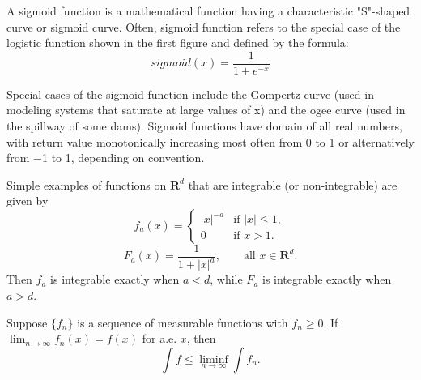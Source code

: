 \begin{definition}
	A sigmoid function is a mathematical function having a characteristic "S"-shaped curve or sigmoid curve. Often, sigmoid function refers to the special case of the logistic function shown in the first figure and defined by the formula:
	\begin{equation}
	sigmoid(x) = \frac{1}{1 + e^{-x}}
	\end{equation}

	\begin{figure}[H]
		\centering
	\end{figure}

	Special cases of the sigmoid function include the Gompertz curve (used in modeling systems that saturate at large values of x) and the ogee curve (used in the spillway of some dams). Sigmoid functions have domain of all real numbers, with return value monotonically increasing most often from 0 to 1 or alternatively from −1 to 1, depending on convention.
\end{definition}



\begin{example}
	Simple examples of functions on $\mathbf{R}^d$ that are integrable
	(or non-integrable) are given by
	\begin{equation}
	f_a(x) =
	\begin{cases}
	|x|^{-a} & \text{if } |x| \leq 1,\\
	0 & \text{if } x > 1.
	\end{cases}
	\end{equation}
	\begin{equation}
	F_a(x) = \frac{1}{1 + |x|^a}, \qquad \text{all } x \in \mathbf{R}^d.
	\end{equation}
	Then $f_a$ is integrable exactly when $a < d$, while $F_a$ is integrable
	exactly when $a > d$.
\end{example}

\begin{lemma}[Fatou]
	Suppose $\{f_n\}$ is a sequence of measurable functions with $f_n \geq 0$.
	If $\lim_{n \to \infty} f_n(x) = f(x)$ for a.e. $x$, then
	\begin{equation}
	\int f \leq \liminf_{n \to \infty} \int f_n.
	\end{equation}
\end{lemma}


